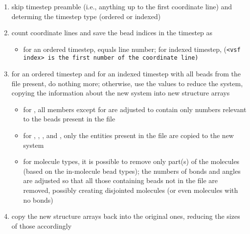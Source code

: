 \begin{enumerate}
  \item skip timestep preamble (i.e., anything up to the first coordinate
    line) and determing the timestep type (ordered or indexed)
  \item count coordinate lines and save the bead indices in
    the timestep as 
    \begin{itemize}
      \item for an ordered timestep,  equals line number; for
        indexed timestep,  (\tt{<vsf index>} is
        the first number of the coordinate line)
    \end{itemize}
  \item for an ordered timestep and for an indexed timestep with all beads
    from the \vsf file present, do nothing more; otherwise, use the
     values to reduce the system, copying the information
    about the new system into new structure arrays
    \begin{itemize}
      \item for , all members except for
         are adjusted to contain only numbers relevant to
        the beads present in the \vcf file
      \item for , , , and , only the entities present
        in the \vcf file are copied to the new system
      \item for molecule types, it is possible to remove only part(s) of the
        molecules (based on the in-molecule bead types); the numbers of
        bonds and angles are adjusted so that all those containing beads
        not in the \vcf file are removed, possibly creating disjointed
        molecules (or even molecules with no bonds)
    \end{itemize}
  \item copy the new structure arrays back into the original ones, reducing
    the sizes of those accordingly
\end{enumerate}
